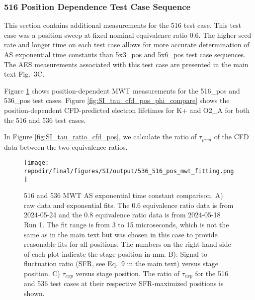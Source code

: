 \clearpage
\subsubsection{516 Position Dependence Test Case Sequence}

This section contains additional measurements for the 516 test case. This test case was a position sweep at fixed nominal equivalence ratio 0.6. The higher seed rate and longer time on each test case allows for more accurate determination of AS exponential time constants than 5x3\_pos and 5x6\_pos test case sequences. The AES measurements associated with this test case are presented in the main text Fig.\ 3C. 


Figure \ref{fig:SI_536_516_pos_mwt_fitting} shows position-dependent MWT measurements for the 516\_pos and 536\_pos test cases. Figure \ref{fig:SI_tau_cfd_pos_phi_compare} shows the position-dependent CFD-predicted electron lifetimes for K+ and O2\_A for both the 516 and 536 test cases. 

In Figure \ref{fig:SI_tau_ratio_cfd_pos}, we calculate the ratio of $\tau_{pred}$ of the CFD data between the two equivalence ratios.


\begin{figure}[]
\centering
\texttt{[image: \\repodir/final/figures/SI/output/536\_516\_pos\_mwt\_fitting.png]}
\caption{516 and 536 MWT AS exponential time constant comparison. A) raw data and exponential fits. The 0.6 equivalence ratio data is from 2024-05-24 and the 0.8 equivalence ratio data is from 2024-05-18 Run 1. The fit range is from 3 to 15 microseconds, which is not the same as in the main text but was chosen in this case to provide reasonable fits for all positions. The numbers on the right-hand side of each plot indicate the stage position in mm. B): Signal to fluctuation ratio (SFR, see Eq.\ 9 in the main text) versus stage position. C) $\tau_{exp}$ versus stage position. The ratio of $\tau_{exp}$ for the 516 and 536 test cases at their respective SFR-maximized positions is shown.} 
\label{fig:SI_536_516_pos_mwt_fitting}
\end{figure}


